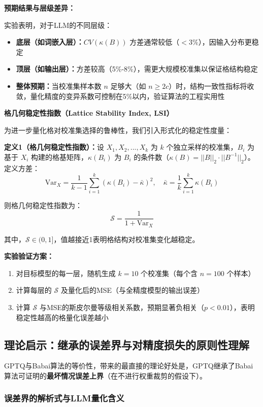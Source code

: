 \documentclass[letterpaper,twocolumn,10pt]{article}
\begin{document}
\textbf{预期结果与层级差异：}

实验表明，对于LLM的不同层级：
\begin{itemize}
\item \textbf{底层（如词嵌入层）：}$CV(\kappa(B))$ 方差通常较低（$<3\%$），因输入分布更稳定
\item \textbf{顶层（如输出层）：}方差较高（5\%-8\%），需更大规模校准集以保证格结构稳定
\item \textbf{整体预期：}当校准集样本数 $n$ 足够大（如 $n \geq 2c$）时，结构一致性指标将收敛，量化精度的变异系数可控制在5\%以内，验证算法的工程实用性
\end{itemize}

\textbf{格几何稳定性指数（Lattice Stability Index, LSI）}

为进一步量化格对校准集选择的鲁棒性，我们引入形式化的稳定性度量：

\textbf{定义1（格几何稳定性指数）：}设 $X_1, X_2, ..., X_k$ 为 $k$ 个独立采样的校准集，$B_i$ 为基于 $X_i$ 构建的格基矩阵，$\kappa(B_i)$ 为 $B_i$ 的条件数（$\kappa(B) = ||B||_2 \cdot ||B^{-1}||_2$）。定义方差：
$$\text{Var}_X = \frac{1}{k-1} \sum_{i=1}^k (\kappa(B_i) - \bar{\kappa})^2, \quad \bar{\kappa} = \frac{1}{k} \sum_{i=1}^k \kappa(B_i)$$

则格几何稳定性指数为：
$$\mathcal{S} = \frac{1}{1 + \text{Var}_X}$$

其中，$\mathcal{S} \in (0, 1]$，值越接近1表明格结构对校准集变化越稳定。

\textbf{实验验证方案：}

\begin{enumerate}
\item 对目标模型的每一层，随机生成 $k=10$ 个校准集（每个含 $n=100$ 个样本）
\item 计算每层的 $\mathcal{S}$ 及量化后的MSE（与全精度模型的输出误差）
\item 计算 $\mathcal{S}$ 与MSE的斯皮尔曼等级相关系数，预期显著负相关（$p < 0.01$），表明稳定性越高的格量化误差越小
\end{enumerate}

\subsection{理论启示：继承的误差界与对精度损失的原则性理解}

GPTQ与Babai算法的等价性，带来的最直接的理论好处是，GPTQ继承了Babai算法可证明的\textbf{最坏情况误差上界}（在不进行权重裁剪的假设下）。

\subsubsection{误差界的解析式与LLM量化含义}
\end{document}
